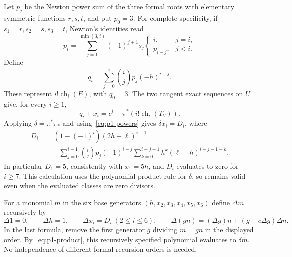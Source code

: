 Let $p_j$ be the Newton power sum of the three formal roots with
elementary symmetric functions $r,s,t$, and put $p_0=3$.
For complete specificity, if $s_1=r,s_2=s,s_3=t$, Newton's identities
read
\begin{equation}\label{eq:newton-recursion}
 p_i=\sum_{j=1}^{\min(3,i)}(-1)^{j+1}s_j
 \begin{cases}
 i,&j=i,\\
 p_{i-j},&j<i.
 \end{cases}
\end{equation}
Define
\begin{equation}\label{eq:unshifted-powers}
 q_i=\sum_{j=0}^i\binom ijp_j(-h)^{i-j}.
\end{equation}
These represent $i!\operatorname{ch}_i(E)$, with $q_0=3$.
The two tangent exact sequences on $U$ give, for every $i\ge1$,
\[
 q_i+x_i=c^i+\pi^*(i!\operatorname{ch}_i(T_V)).
\]
Applying $\delta=\pi^*\pi_*$ and using~\eqref{eq:p1-powers} gives
$\delta x_i=D_i$, where
\begin{equation}\label{eq:D-polynomials}
\begin{split}
 D_i={}&(1-(-1)^i)(2h-\ell)^{i-1}\\
 &-\sum_{j=0}^{i-1}\binom ijp_j(-1)^{i-j}
      \sum_{k=0}^{i-j-1}h^k(\ell-h)^{i-j-1-k}.
\end{split}
\end{equation}
In particular $D_1=5$, consistently with $x_1=5h$, and $D_i$ evaluates
to zero for $i\ge7$. This calculation uses the polynomial product
rule for $\delta$, so remains valid even when the evaluated classes
are zero divisors.

For a monomial $m$ in the six base generators
$(h,x_2,x_3,x_4,x_5,x_6)$ define $\Delta m$ recursively by
\begin{equation}\label{eq:Delta-recursion}
 \Delta1=0,\qquad\Delta h=1,\qquad\Delta x_i=D_i\ (2\le i\le6),
 \qquad
 \Delta(gn)=(\Delta g)n+(g-c\Delta g)\Delta n.
\end{equation}
In the last formula, remove the first generator $g$ dividing $m=gn$
in the displayed order. By~\eqref{eq:p1-product}, this recursively
specified polynomial evaluates to $\delta m$. No independence of
different formal recursion orders is needed.

